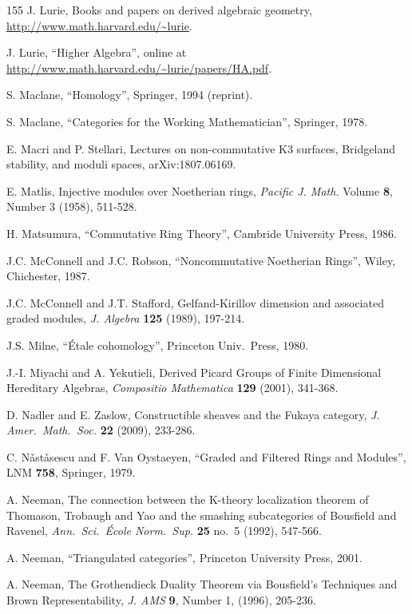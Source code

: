 \begin{thebibliography}{155}
 J. Lurie, Books and papers on derived algebraic geometry, 
\url{http://www.math.harvard.edu/~lurie}.

 J. Lurie, 
``Higher Algebra'', online at 
\url{http://www.math.harvard.edu/~lurie/papers/HA.pdf}.

 S. Maclane, ``Homology'', Springer, 1994 (reprint).

 S. Maclane, 
``Categories for the Working Mathematician'', 
Springer, 1978. 

 E. Macri and P. Stellari,
Lectures on non-commutative K3 surfaces, Bridgeland stability, and moduli 
spaces, 
arXiv:1807.06169. 

 E. Matlis,
Injective modules over Noetherian rings,
{\em Pacific J. Math.} Volume {\bf 8}, Number 3 (1958), 511-528. 

 H. Matsumura, 
``Commutative Ring Theory'', Cambride University Press, 1986. 

 J.C. McConnell and J.C. Robson, 
``Noncommutative Noetherian Rings'', Wiley, Chichester, 1987.

 J.C. McConnell and J.T. Stafford, 
Gelfand-Kirillov dimension and associated graded modules,
{\em J. Algebra} {\bf 125} (1989), 197-214.

 J.S. Milne,
``\'Etale cohomology'', 
Princeton Univ.\ Press, 1980. 

 J.-I. Miyachi and A. Yekutieli,
Derived Picard Groups of Finite Dimensional Hereditary Algebras,
{\em Compositio Mathematica} {\bf 129} (2001), 341-368.

 D. Nadler and E. Zaslow, 
Constructible sheaves and the Fukaya category,
{\em J. Amer.\ Math.\ Soc.} {\bf 22} (2009), 233-286.

 C. N\v{a}st\v{a}sescu and F. Van Oystaeyen, 
``Graded and Filtered Rings and Modules'', LNM {\bf 758}, Springer, 1979.

 A. Neeman, 
The connection between the K-theory localization theorem of Thomason, Trobaugh 
and Yao and the smashing subcategories of Bousfield and Ravenel,
{\em Ann.\ Sci.\ \'Ecole Norm.\ Sup.} {\bf 25} no.\ 5 (1992), 547-566. 

 A. Neeman, 
``Triangulated categories'', Princeton University Press, 2001.

 A. Neeman, 
The Grothendieck Duality Theorem via Bousfield's Techniques and Brown 
Representability,
{\em J. AMS} {\bf 9}, Number 1, (1996), 205-236.


\end{thebibliography}
